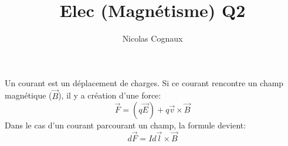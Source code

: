 \documentclass[11pt,a4paper]{article} %
\title{Elec (Magnétisme) Q2}
\author{Nicolas Cognaux}
\begin{document}
\maketitle
Un courant est un déplacement de charges. Si ce courant rencontre un champ magnétique ($\vec B$), il y a création d'une force:
$$
\vec F = (q \vec E) + q \vec v \times \vec B
$$
Dans le cas d'un courant parcourant un champ, la formule devient:
$$
d \vec F = Id\vec l \times \vec B
$$
\end{document}
